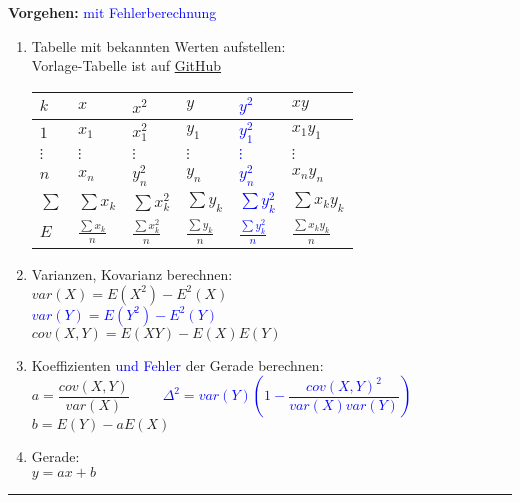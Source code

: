 \begin{minipage}[t]{10cm}
  \textbf{Vorgehen:}
  \textcolor{blue}{mit Fehlerberechnung}
	\begin{enumerate}
		\item Tabelle mit bekannten Werten aufstellen:\\
		\scriptsize
		Vorlage-Tabelle ist auf \href{https://github.com/RostBau/WrStat/tree/master/Zusatzblaetter/LineareRegression}{GitHub}\\ %
		\normalsize
  		\begin{tabular}{|l||l|l||l|l||l|}
  		  \hline
        \textbf{$k$} & \textbf{$x$} & \textbf{$x^2$} & \textbf{$y$} &
  		  \textcolor{blue}{\textbf{$y^2$}} & \textbf{$xy$} \\
  		  \hline \hline
  		  $1$ & $x_1$ & $x_1^2$ & $y_1$ & \textcolor{blue}{$y_1^2$} & $x_1y_1$ \\
  		  \hline
  		  $\vdots$ & $\vdots$ & $\vdots$ & $\vdots$ & \textcolor{blue}{$\vdots$} &
  		  $\vdots$ \\\hline $n$ & $x_n$ & $y_n^2$ & $y_n$ & \textcolor{blue}{$y_n^2$} & $x_ny_n$ \\
  		  \hline
  		  \hline
  		  $\sum$ & $\sum x_k$ & $\sum x_k^2$ & $\sum y_k$ & \textcolor{blue}{$\sum
  		  y_k^2$} & $\sum x_ky_k$ \\
  		  \hline $E$ & $\frac{\sum x_k}{n}$ & $\frac{\sum x_k^2}{n}$ & $\frac{\sum
  		  y_k}{n}$ & \textcolor{blue}{$\frac{\sum y_k^2}{n}$} & $\frac{\sum x_ky_k}{n}$ \\
  		  \hline
  		\end{tabular} 
		\item Varianzen, Kovarianz berechnen: \\
		  $var(X) = E(X^2) - E^2(X)$ \\
		  \textcolor{blue}{$var(Y) = E(Y^2) - E^2(Y)$} \\
		  $cov(X,Y) = E(XY) - E(X)E(Y)$
		\item Koeffizienten \textcolor{blue}{und Fehler} der Gerade berechnen: \\
		  $a=\dfrac{cov(X,Y)}{var(X)}$
		  \textcolor{blue}{$\qquad\Delta^2=var(Y)\left(1-\dfrac{cov(X,Y)^2}
		  {var(X)var(Y)}\right) $} \\
		  $b=E(Y)-aE(X)$
		\item Gerade: \\
		$y=ax+b$
	\end{enumerate}
\end{minipage}
\vspace{.2cm}
\hrule
